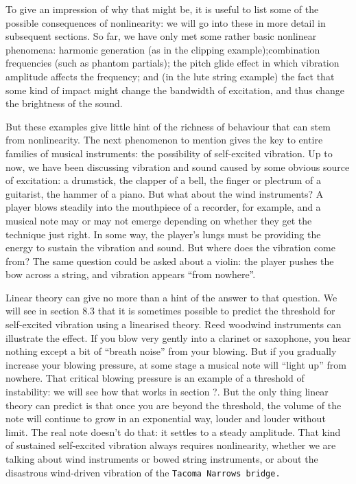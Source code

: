   To give an impression of why that might be, it is useful to list some of the 
  possible consequences of nonlinearity: we will go into these in more detail 
  in subsequent sections. So far, we have only met some rather basic nonlinear 
  phenomena: harmonic generation (as in the clipping example);combination 
  frequencies (such as phantom partials); the pitch glide effect in which 
  vibration amplitude affects the frequency; and (in the lute string example) 
  the fact that some kind of impact might change the bandwidth of excitation, 
  and thus change the brightness of the sound. 

  But these examples give little hint of the richness of behaviour that can 
  stem from nonlinearity. The next phenomenon to mention gives the key to 
  entire families of musical instruments: the possibility of self-excited 
  vibration. Up to now, we have been discussing vibration and sound caused by 
  some obvious source of excitation: a drumstick, the clapper of a bell, the 
  finger or plectrum of a guitarist, the hammer of a piano. But what about the 
  wind instruments? A player blows steadily into the mouthpiece of a recorder, 
  for example, and a musical note may or may not emerge depending on whether 
  they get the technique just right. In some way, the player’s lungs must be 
  providing the energy to sustain the vibration and sound. But where does the 
  vibration come from? The same question could be asked about a violin: the 
  player pushes the bow across a string, and vibration appears “from nowhere”. 

  Linear theory can give no more than a hint of the answer to that question. We 
  will see in section 8.3 that it is sometimes possible to predict the 
  threshold for self-excited vibration using a linearised theory. Reed woodwind 
  instruments can illustrate the effect. If you blow very gently into a 
  clarinet or saxophone, you hear nothing except a bit of “breath noise” from 
  your blowing. But if you gradually increase your blowing pressure, at some 
  stage a musical note will “light up” from nowhere. That critical blowing 
  pressure is an example of a threshold of instability: we will see how that 
  works in section ?. But the only thing linear theory can predict is that once 
  you are beyond the threshold, the volume of the note will continue to grow in 
  an exponential way, louder and louder without limit. The real note doesn’t do 
  that: it settles to a steady amplitude. That kind of sustained self-excited 
  vibration always requires nonlinearity, whether we are talking about wind 
  instruments or bowed string instruments, or about the disastrous wind-driven 
  vibration of the \tt{}Tacoma Narrows bridge\rm{}. 

